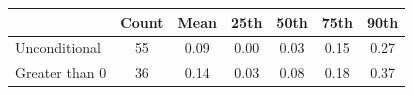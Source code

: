 \begin{tabular}{l*{6}{c}}
\toprule
            &       Count&        Mean&        25th&        50th&        75th&        90th\\
\midrule
Unconditional&          55&        0.09&        0.00&        0.03&        0.15&        0.27\\
Greater than 0&          36&        0.14&        0.03&        0.08&        0.18&        0.37\\
\bottomrule
\end{tabular}
